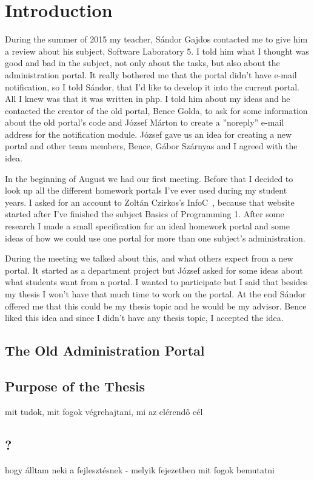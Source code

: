 \chapter{Introduction}

During the summer of 2015 my teacher, Sándor Gajdos contacted me to give him a review about his subject, Software Laboratory 5. I told him what I thought was good and bad in the subject, not only about the tasks, but also about the administration portal. It really bothered me that the portal didn't have e-mail notification, so I told Sándor, that I'd like to develop it into the current portal. All I knew was that it was written in php. I told him about my ideas and he contacted the creator of the old portal, Bence Golda, to ask for some information about the old portal's code and József Márton to create a ''noreply'' e-mail address for the notification module. József gave us an idea for creating a new portal and other team members, Bence, Gábor Szárnyas and I agreed with the idea. 

In the beginning of August we had our first meeting. Before that I decided to look up all the different homework portals I've ever used during my student years. I asked for an account to Zoltán Czirkos's InfoC~\cite{InfoC}, because that website started after I've finished the subject Basics of Programming 1. After some research I made a small specification for an ideal homework portal and some ideas of how we could use one portal for more than one subject's administration.

During the meeting we talked about this, and what others expect from a new portal. It started as a department project but József asked for some ideas about what students want from a portal. I wanted to participate but I said that besides my thesis I won't have that much time to work on the portal. At the end Sándor offered me that this could be my thesis topic and he would be my advisor. Bence liked this idea and since I didn't have any thesis topic, I accepted the idea.

\section{The Old Administration Portal} 

\section{Purpose of the Thesis}
mit tudok, mit fogok végrehajtani, mi az elérendő cél

\section{?}
hogy álltam neki a fejlesztésnek - melyik fejezetben mit fogok bemutatni